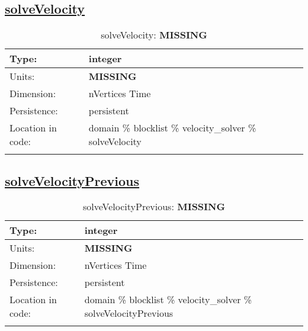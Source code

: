 \subsection[solveVelocity]{\hyperref[sec:var_tab_velocity_solver]{solveVelocity}}
\label{subsec:var_sec_velocity_solver_solveVelocity}
\begin{center}
\begin{longtable}{| p{2.0in} | p{4.0in} |}
        \hline 
        Type: & integer \\
        \hline 
        Units: & {\bf \color{red} MISSING} \\
        \hline 
        Dimension: & nVertices Time \\
        \hline 
        Persistence: & persistent \\
        \hline 
         Location in code: & domain \% blocklist \% velocity\_solver \% solveVelocity \\
         \hline 
    \caption{solveVelocity: {\bf \color{red} MISSING}}
\end{longtable}
\end{center}
\subsection[solveVelocityPrevious]{\hyperref[sec:var_tab_velocity_solver]{solveVelocityPrevious}}
\label{subsec:var_sec_velocity_solver_solveVelocityPrevious}
\begin{center}
\begin{longtable}{| p{2.0in} | p{4.0in} |}
        \hline 
        Type: & integer \\
        \hline 
        Units: & {\bf \color{red} MISSING} \\
        \hline 
        Dimension: & nVertices Time \\
        \hline 
        Persistence: & persistent \\
        \hline 
         Location in code: & domain \% blocklist \% velocity\_solver \% solveVelocityPrevious \\
         \hline 
    \caption{solveVelocityPrevious: {\bf \color{red} MISSING}}
\end{longtable}
\end{center}
